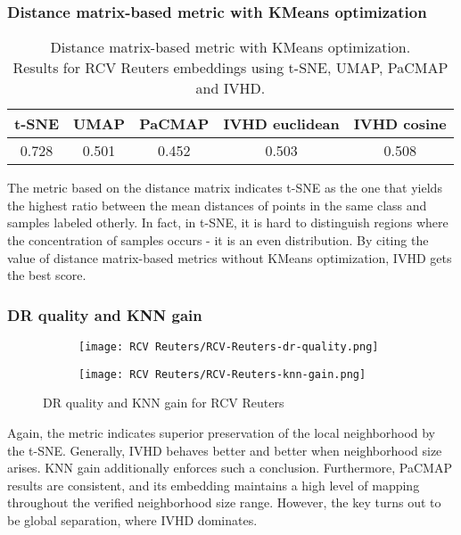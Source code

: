 \documentclass[12pt]{article}
\begin{document}
\subsubsection{Distance matrix-based metric with KMeans optimization}
\begin{table}[h]
\centering
\caption{Distance matrix-based metric with KMeans optimization. \\ Results for RCV Reuters embeddings using t-SNE, UMAP, PaCMAP and IVHD.}
\begin{tabular}{|c|c|l|l|l|}
\hline
\textbf{t-SNE} & \textbf{UMAP} & \textbf{PaCMAP}            & \textbf{IVHD euclidean}    & \textbf{IVHD cosine}       \\ \hline
0.728          & 0.501         & \multicolumn{1}{c|}{0.452} & \multicolumn{1}{c|}{0.503} & \multicolumn{1}{c|}{0.508} \\ \hline
\end{tabular}
\end{table}
The metric based on the distance matrix indicates t-SNE as the one that yields the highest ratio between the mean distances of points in the same class and samples labeled otherly. In fact, in t-SNE, it is hard to distinguish regions where the concentration of samples occurs - it is an even distribution. By citing the value of distance matrix-based metrics without KMeans optimization, IVHD gets the best score.

\clearpage
\subsubsection{DR quality and KNN gain}
\begin{figure}[h]
\centering
\begin{subfigure}{.5\textwidth}
  \centering
  \texttt{[image: RCV Reuters/RCV-Reuters-dr-quality.png]}
  \label{fig:sub1}
\end{subfigure}%
\begin{subfigure}{.5\textwidth}
  \centering
  \texttt{[image: RCV Reuters/RCV-Reuters-knn-gain.png]}
  \label{fig:sub2}
\end{subfigure}
\caption{DR quality and KNN gain for RCV Reuters}
\label{fig:test}
\end{figure}
Again, the metric indicates superior preservation of the local neighborhood by the t-SNE. Generally, IVHD behaves better and better when neighborhood size arises. KNN gain additionally enforces such a conclusion. Furthermore, PaCMAP results are consistent, and its embedding maintains a high level of mapping throughout the verified neighborhood size range. However, the key turns out to be global separation, where IVHD dominates.
\end{document}
